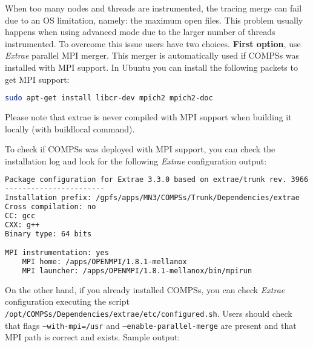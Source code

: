 When too many nodes and threads are instrumented, the tracing merge can fail due to an OS limitation, namely: the maximum open files. This problem usually happens when using advanced mode due to the larger number of threads instrumented. To overcome this issue users have two choices. \textbf{First option}, use \textit{Extrae} parallel MPI merger. This merger is automatically used if COMPSs was installed with MPI support. In Ubuntu you can install the following packets to get MPI support:

\begin{lstlisting}[language=bash]
sudo apt-get install libcr-dev mpich2 mpich2-doc
\end{lstlisting}

Please note that extrae is never compiled with MPI support when building it locally (with buildlocal command).

To check if COMPSs was deployed with MPI support, you can check the installation log and look for the following \textit{Extrae} configuration output:

\begin{lstlisting}[language=bash]
Package configuration for Extrae 3.3.0 based on extrae/trunk rev. 3966:
-----------------------
Installation prefix: /gpfs/apps/MN3/COMPSs/Trunk/Dependencies/extrae
Cross compilation: no
CC: gcc
CXX: g++
Binary type: 64 bits

MPI instrumentation: yes
	MPI home: /apps/OPENMPI/1.8.1-mellanox
	MPI launcher: /apps/OPENMPI/1.8.1-mellanox/bin/mpirun
\end{lstlisting}

On the other hand, if you already installed COMPSs, you can check \textit{Extrae} configuration executing the script \texttt{/opt/COMPSs/Dependencies/extrae/etc/configured.sh}. Users should check that flags \texttt{--with-mpi=/usr} and \texttt{--enable-parallel-merge} are present and that MPI path is correct and exists. Sample output:

